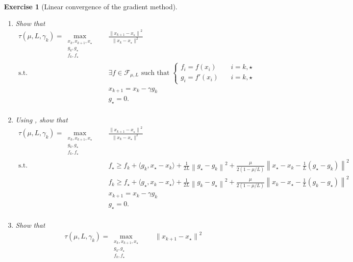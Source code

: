 \documentclass[11pt,a4paper]{article}
\newcommand{\normsq}[1]{{\left\lVert#1\right\rVert}^2}
\newcommand{\inner}[2]{{\langle #1, #2\rangle}}
\newtheorem{exercise}{Exercise}
\begin{document}
\begin{exercise}[Linear convergence of the gradient method]
\begin{enumerate}
		Note that we will (sometimes abusively) use $\max$ instead of $\sup$ in the sequel as the optimum is usually attained for such problems (for this exercise, this is actually easy to show as the optimization problem is over a compact set).
	\item Show that
	\begin{equation*}
		\begin{aligned}
		\tau(\mu,L,\gamma_k)=\max_{\substack{x_k,x_{k+1},x_\star\\g_k,g_\star\\f_k,f_\star}} \quad & \frac{{\|x_{k+1}-x_\star\|}^2}{\|x_k-x_\star\|^2}\\
		\text{s.t. } & \exists f\in\mathcal{F}_{\mu,L} \text{ such that }\left\{\begin{array}{ll}
			f_i=f(x_i)\quad & i=k,\star\\
			g_i=f'(x_i)\quad & i=k,\star
			\end{array}\right.\\
		& x_{k+1}=x_k-\gamma  g_k\\
		& g_\star=0.\\
		\end{aligned}
		\end{equation*}
	\item Using , show that
	\begin{equation*}
		\begin{aligned}
		\tau(\mu,L,\gamma_k)=\max_{\substack{x_k,x_{k+1},x_\star\\g_k,g_\star\\f_k,f_\star}} \quad & \frac{{\|x_{k+1}-x_\star\|}^2}{\|x_k-x_\star\|^2}\\
		\text{s.t. } & f_\star\geqslant f_k+\inner{g_k}{x_\star-x_k}+\tfrac{1}{2L}\normsq{g_\star-g_k}+\tfrac{\mu}{2(1-\mu/L)}\normsq{x_\star-x_k-\tfrac{1}{L}(g_\star-g_k)}\\
			&f_k\geqslant f_\star+\inner{g_\star}{x_k-x_\star}+\tfrac{1}{2L}\normsq{g_k-g_\star}+\tfrac{\mu}{2(1-\mu/L)}\normsq{x_k-x_\star-\tfrac{1}{L}(g_k-g_\star)}\\
		& x_{k+1}=x_k-\gamma  g_k\\
		& g_\star=0.\\
		\end{aligned}
		\end{equation*}
	\item Show that
	\begin{equation*}
		\begin{aligned}
		\tau(\mu,L,\gamma_k)=\max_{\substack{x_k,x_{k+1},x_\star\\g_k,g_\star\\f_k,f_\star}} \quad &{\|x_{k+1}-x_\star\|}^2\\

\end{aligned}
\end{equation*}
\end{enumerate}
\end{exercise}
\end{document}
